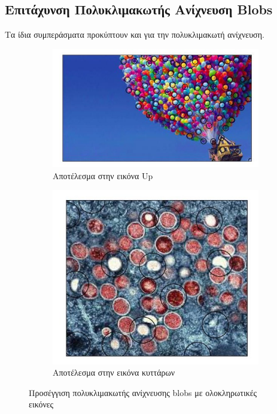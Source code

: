 \documentclass{article}
\newcommand{\eng}[1]{\foreignlanguage{english}{#1}}
\begin{document}
\subsection{Επιτάχυνση Πολυκλιμακωτής Ανίχνευση \eng{Blobs}}

Τα ίδια συμπεράσματα προκύπτουν και για την πολυκλιμακωτή ανίχνευση.

\begin{figure}[h]
    \centering
    \begin{subfigure}{0.7\textwidth}
        \includegraphics[width=\textwidth]{../image-plots/images-scaled/blob-detection-multiscale-ii-up-scaled.jpg}
        \caption{Αποτέλεσμα στην εικόνα \eng{Up}}
        \label{fig:cells-multiscale-ii}
    \end{subfigure}
    \begin{subfigure}{0.7\textwidth}
        \includegraphics[width=\textwidth]{../image-plots/images-scaled/blob-detection-multiscale-ii-cells-scaled.jpg}
        \caption{Αποτέλεσμα στην εικόνα κυττάρων}
        \label{fig:cells-multiscale-ii}
    \end{subfigure}
    \caption{Προσέγγιση πολυκλιμακωτής ανίχνευσης \eng{blobs} με ολοκληρωτικές εικόνες}
\end{figure}
\FloatBarrier
\end{document}
